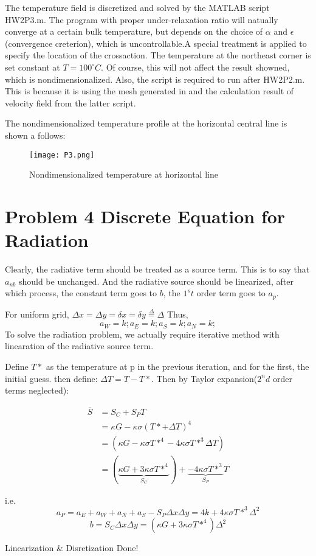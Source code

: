 \documentclass[a4paper,10pt]{report}
\begin{document}
The temperature field is discretized and solved by the MATLAB script HW2P3.m. 
The program with proper under-relaxation ratio will natually converge at a certain bulk temperature, but depends on the 
choice of $\alpha$ and $\epsilon$ (convergence creterion), which is uncontrollable.A special treatment is 
applied to specify the location of the crossaction. The temperature at the northeast corner is 
set constant at $ T = 100 ^\circ C $. Of course, this will not affect the result showned, which is nondimensionalized. 
Also, the script is required to run after HW2P2.m. This is because it is using the mesh generated in and the calculation 
result of velocity field from the latter script. 


The nondimensionalized temperature profile at the horizontal central line is shown a follows:
\begin{figure}
 \centering
 \texttt{[image: P3.png]}
 \caption{Nondimensionalized temperature at horizontal  line}
\end{figure}

\section{Problem 4 Discrete Equation for Radiation}


Clearly, the radiative term should be treated as a source term. This is to say that $a_{nb}$ should be unchanged. And the 
radiative source should be linearized, after which process, the constant term goes to $b$, the $1^st$ order term goes to
$a_p$. 


For uniform grid, $ \Delta x = \Delta y = \delta x = \delta y \overset{\Delta}{=} \Delta $ Thus,
\begin{equation}
 a_W = k;
 a_E = k;
 a_S = k;
 a_N = k;
\end{equation}
To solve the radiation problem, we actually require iterative method with linearation of the radiative source term. 


Define $T*$ as the temperature at p in the previous iteration, and for the first, the initial guess. then define: 
$\Delta T = T - T* $. 
Then by Taylor expansion($2^nd$ order terms neglected):

\begin{equation}
\begin{split}
 \overline S &= S_C + S_P T \\
             &= \kappa G - \kappa \sigma (T* + \Delta T)^4 \\
             &= (\kappa G - \kappa \sigma T*^4 - 4 \kappa \sigma T*^3 \Delta T)\\
             &= (\underbrace{\kappa G + 3\kappa \sigma T*^4}_{S_C}) + \underbrace{-4 \kappa \sigma T*^3}_{S_P} T 
\end{split}
\end{equation}



i.e. 
\begin{equation}
 a_P = a_E + a_W + a_N + a_S - S_P\Delta x \Delta y = 4k + 4\kappa \sigma T*^3 \Delta^2 
\end{equation}
\begin{equation}
 b = S_C \Delta x \Delta y 
    = (\kappa G + 3\kappa \sigma T*^4)\Delta^2
\end{equation}


Linearization \& Disretization Done! 
\end{document}
